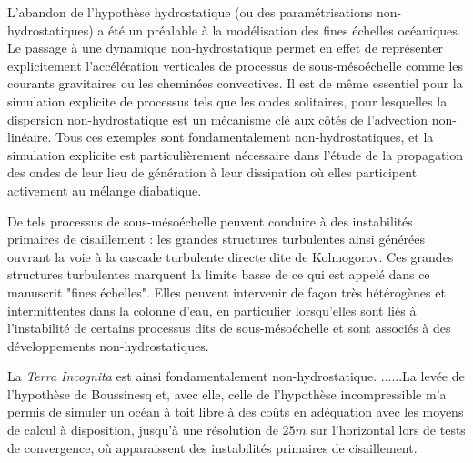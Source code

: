 L'abandon de l'hypothèse hydrostatique (ou des paramétrisations non-hydrostatiques) a été un préalable à la modélisation des fines échelles océaniques. Le passage à une dynamique non-hydrostatique permet en effet de représenter explicitement l'accélération verticales de processus de sous-mésoéchelle comme les courants gravitaires ou les cheminées convectives. Il est de même essentiel pour la simulation explicite de processus tels que les ondes solitaires, pour lesquelles la dispersion non-hydrostatique est un mécanisme clé aux côtés de l'advection non-linéaire. Tous ces exemples sont fondamentalement non-hydrostatiques, et la simulation explicite est particulièrement nécessaire dans l'étude de la propagation des ondes de leur lieu de génération à leur dissipation où elles participent activement au mélange diabatique. %



\color{blue}
De tels processus de sous-mésoéchelle peuvent conduire à des instabilités primaires de cisaillement : les grandes structures turbulentes ainsi générées ouvrant la voie à la cascade turbulente directe dite de Kolmogorov. Ces grandes structures turbulentes marquent la limite basse de ce qui est appelé dans ce manuscrit "fines échelles". Elles peuvent intervenir de façon très hétérogènes et intermittentes dans la colonne d'eau, en particulier lorsqu'elles sont liés à l'instabilité de certains processus dits de sous-mésoéchelle et sont associés à des développements non-hydrostatiques.%

La \textit{Terra Incognita} est ainsi fondamentalement non-hydrostatique. ......La levée de l'hypothèse de Boussinesq et, avec elle, celle de l'hypothèse incompressible m'a permis de simuler un océan à toit libre à des coûts en adéquation avec les moyens de calcul à disposition, jusqu'à une résolution de $25m$ sur l'horizontal lors de tests de convergence, où apparaissent des instabilités primaires de cisaillement.

